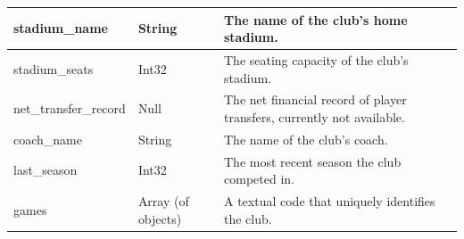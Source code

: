 \documentclass{Configuration_Files/PoliMi3i_thesis}
\begin{document}
\begin{tabular}{|l|l|p{8cm}|}
    stadium\_name                   & String                  & The name of the club's home stadium.                                                               \\ \hline
    stadium\_seats                  & Int32                   & The seating capacity of the club's stadium.                                                        \\ \hline
    net\_transfer\_record           & Null                    & The net financial record of player transfers, currently not available.                             \\ \hline
    coach\_name                     & String                  & The name of the club's coach.                                                                      \\ \hline
    last\_season                    & Int32                   & The most recent season the club competed in.                                                       \\ \hline
    games                           & Array (of objects)      & A textual code that uniquely identifies the club.                                                  \\ \hline
    \end{tabular}
\end{document}
